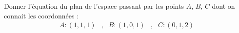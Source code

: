 Donner l'\'equation du plan de l'espace passant par les points $A$, $B$, $C$ dont on connait les coordonn\'ees :
\begin{align*}
 A : (1,1,1) &,& B : (1,0,1) &,& C :(0,1,2)
\end{align*}
\medskip
